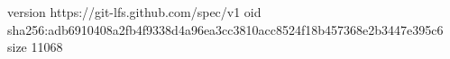 version https://git-lfs.github.com/spec/v1
oid sha256:adb6910408a2fb4f9338d4a96ea3cc3810acc8524f18b457368e2b3447e395c6
size 11068
